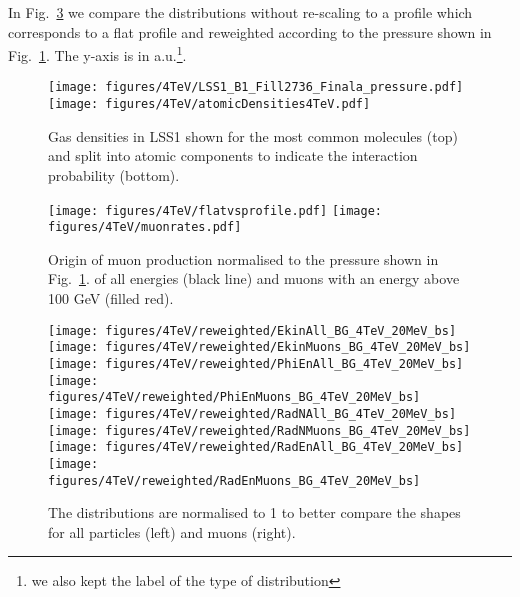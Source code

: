 In Fig.~\ref{reweighted1} we compare the distributions without re-scaling to a profile which corresponds to a flat profile and reweighted according to the pressure shown in Fig.~\ref{pressure2012}. The y-axis is in a.u.\footnote{we also kept the label of the type of distribution}.

\begin{figure}[!htb]
\begin{center}
  \texttt{[image: figures/4TeV/LSS1\_B1\_Fill2736\_Finala\_pressure.pdf]}
  \texttt{[image: figures/4TeV/atomicDensities4TeV.pdf]}
\end{center}
\vspace{-0.6cm}
 \caption{Gas densities in LSS1 shown for the most common molecules (top) and split into atomic components to indicate the interaction probability (bottom).
  \label{pressure2012}}
\end{figure}

\begin{figure}[!htb]
\begin{center}
  \texttt{[image: figures/4TeV/flatvsprofile.pdf]}
  \texttt{[image: figures/4TeV/muonrates.pdf]}
\end{center}
\vspace{-0.6cm}
 \caption{Origin of muon production normalised to the pressure shown in Fig.~\ref{pressure2012}. of all energies (black line) and muons with an energy above 100 GeV (filled red).
  \label{normed}}
\end{figure}


\begin{figure}
\begin{center}
  \texttt{[image: figures/4TeV/reweighted/EkinAll\_BG\_4TeV\_20MeV\_bs]}
  \texttt{[image: figures/4TeV/reweighted/EkinMuons\_BG\_4TeV\_20MeV\_bs]}
  \texttt{[image: figures/4TeV/reweighted/PhiEnAll\_BG\_4TeV\_20MeV\_bs]}
  \texttt{[image: figures/4TeV/reweighted/PhiEnMuons\_BG\_4TeV\_20MeV\_bs]}
  \texttt{[image: figures/4TeV/reweighted/RadNAll\_BG\_4TeV\_20MeV\_bs]}
  \texttt{[image: figures/4TeV/reweighted/RadNMuons\_BG\_4TeV\_20MeV\_bs]}
  \texttt{[image: figures/4TeV/reweighted/RadEnAll\_BG\_4TeV\_20MeV\_bs]}
  \texttt{[image: figures/4TeV/reweighted/RadEnMuons\_BG\_4TeV\_20MeV\_bs]}
\end{center}
\vspace{-0.6cm}
 \caption{The distributions are normalised to 1 to better compare the shapes for all particles (left) and muons (right).
  \label{reweighted1}} 
\end{figure}
